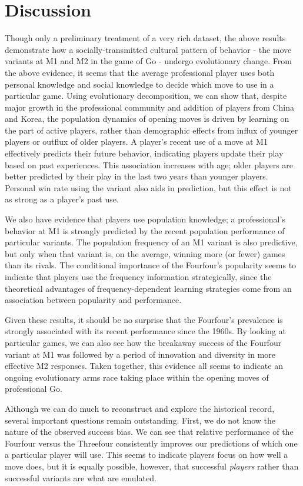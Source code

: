 \section{Discussion}

Though only a preliminary treatment of a very rich dataset, the above results demonstrate how a socially-transmitted cultural pattern of behavior - the move variants at M1 and M2 in the game of Go - undergo evolutionary change.  From the above evidence, it seems that the average professional player uses both personal knowledge and social knowledge to decide which move to use in a particular game.  Using evolutionary decomposition, we can show that, despite major growth in the professional community and addition of players from China and Korea, the population dynamics of opening moves is driven by learning on the part of active players, rather than demographic effects from influx of younger players or outflux of older players.  A player's recent use of a move at M1 effectively predicts their future behavior, indicating players update their play based on past experiences.  This association increases with age; older players are better predicted by their play in the last two years than younger players.  Personal win rate using the variant also aids in prediction, but this effect is not as strong as a player's past use. 

We also have evidence that players use population knowledge; a professional's behavior at M1 is strongly predicted by the recent population performance of particular variants.  The population frequency of an M1 variant is also predictive, but only when that variant is, on the average, winning more (or fewer) games than its rivals.  The conditional importance of the Fourfour's popularity seems to indicate that players use the frequency information strategically, since the theoretical advantages of frequency-dependent learning strategies come from an association between popularity and performance.  

Given these results, it should be no surprise that the Fourfour's prevalence is strongly associated with its recent performance since the 1960s.  By looking at particular games, we can also see how the breakaway success of the Fourfour variant at M1 was followed by a period of innovation and diversity in more effective M2 responses.  Taken together, this evidence all seems to indicate an ongoing evolutionary arms race taking place within the opening moves of professional Go.  

Although we can do much to reconstruct and explore the historical record, several important questions remain outstanding.  First, we do not know the nature of the observed success bias.  We can see that relative performance of the Fourfour versus the Threefour consistently improves our predictions of which one a particular player will use.  This seems to indicate players focus on how well a move does, but it is equally possible, however, that successful \textit{players} rather than successful variants are what are emulated.  

